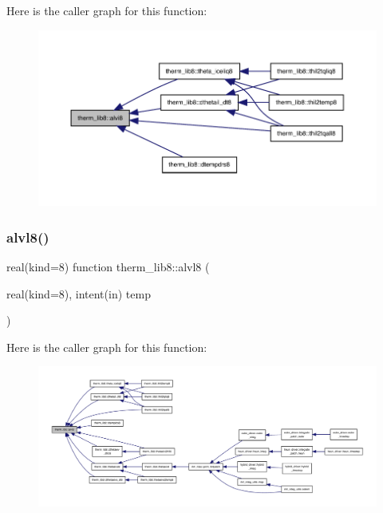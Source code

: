 Here is the caller graph for this function\+:
\nopagebreak
\begin{figure}[H]
\begin{center}
\leavevmode
\includegraphics[width=350pt]{namespacetherm__lib8_a3b1992f0fffee3a316b79819cac27382_icgraph}
\end{center}
\end{figure}
\mbox{\label{namespacetherm__lib8_a8dfe9d6c06c19f28e388354ce1001ec2}} 
\subsubsection{\texorpdfstring{alvl8()}{alvl8()}}
{\footnotesize\ttfamily real(kind=8) function therm\+\_\+lib8\+::alvl8 (\begin{DoxyParamCaption}\item[{real(kind=8), intent(in)}]{temp }\end{DoxyParamCaption})}

Here is the caller graph for this function\+:
\nopagebreak
\begin{figure}[H]
\begin{center}
\leavevmode
\includegraphics[width=350pt]{namespacetherm__lib8_a8dfe9d6c06c19f28e388354ce1001ec2_icgraph}
\end{center}
\end{figure}
\mbox{\label{namespacetherm__lib8_af5c7259346e1ee029458410d49100d77}} 
